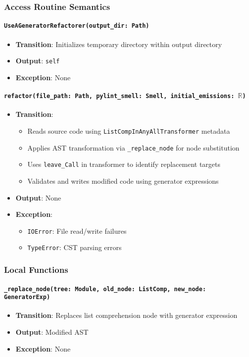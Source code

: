 \documentclass[12pt, titlepage]{article}
\begin{document}
\subsubsection{Access Routine Semantics}

\paragraph{\texttt{UseAGeneratorRefactorer(output\_dir: Path)}}
\begin{itemize}
\item \textbf{Transition}: Initializes temporary directory within output directory
\item \textbf{Output}: \texttt{self}
\item \textbf{Exception}: None
\end{itemize}

\paragraph{\texttt{refactor(file\_path: Path, pylint\_smell: Smell, initial\_emissions: $\mathbb{R}$)}}
\begin{itemize}
\item \textbf{Transition}:
\begin{itemize}
\item Reads source code using \texttt{ListCompInAnyAllTransformer} metadata
\item Applies AST transformation via \texttt{\_replace\_node} for node substitution
\item Uses \texttt{leave\_Call} in transformer to identify replacement targets
\item Validates and writes modified code using generator expressions
\end{itemize}
\item \textbf{Output}: None
\item \textbf{Exception}:
\begin{itemize}
\item \texttt{IOError}: File read/write failures
\item \texttt{TypeError}: CST parsing errors
\end{itemize}
\end{itemize}

\subsubsection{Local Functions}

\paragraph{\texttt{\_replace\_node(tree: Module, old\_node: ListComp, new\_node: GeneratorExp)}}
\begin{itemize}
\item \textbf{Transition}: Replaces list comprehension node with generator expression
\item \textbf{Output}: Modified AST
\item \textbf{Exception}: None
\end{itemize}
\end{document}
